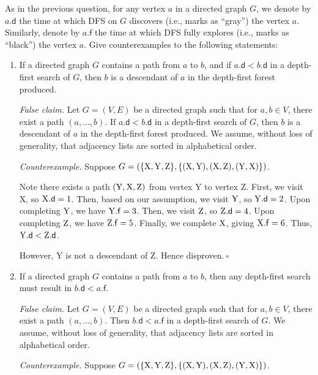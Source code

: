 \newpage
\noindent
As in the previous question, for any vertex $a$ in a directed graph $G$, we denote by $a.\mathsf{d} $ the time at which DFS on $G$ discovers (i.e., marks as ``gray'') the vertex $a$. Similarly, denote by $a.\mathsf{f} $ the time at which DFS fully explores (i.e., marks as ``black'') the vertex $a$. Give counterexamples to the following statements:
\begin{enumerate}[start=2]
    \item If a directed graph $G$ contains a path
    from $a$ to $b$, and if $a.\mathsf{d} < b.\mathsf{d}$ in a depth-first search of $G$, then $b$ is a descendant
    of $a$ in the depth-first forest produced.

\begin{solution}
\textit{False claim. }Let $G=(V,E)$ be a directed graph such that for $a,b\in V$, there exist a path $(a,\dots,b)$. If $a.\mathsf{d}<b.\mathsf{d}$ in a depth-first search of $G$, then $b$ is a descendant of $a$ in the depth-first forest produced. We assume, without loss of generality, that adjacency lists are sorted in alphabetical order.

\textit{Counterexample. }Suppose $G=(\{{\rm X},{\rm Y},{\rm Z}\},\{({\rm X},{\rm Y}),({\rm X},{\rm Z}),({\rm Y},{\rm X})\})$.

Note there exists a path $({\rm Y},{\rm X},{\rm Z})$ from vertex Y to vertex Z. First, we visit X, so ${\rm X}.\mathsf{d}=1$. Then, based on our assumption, we visit ${\rm Y}$, so ${\rm Y}.\mathsf{d}=2$. Upon completing ${\rm Y}$, we have ${\rm Y}.\mathsf{f}=3$. Then, we visit ${\rm Z}$, so ${\rm Z}.\mathsf{d}=4$. Upon completing ${\rm Z}$, we have ${\rm Z}.\mathsf{f}=5$. Finally, we complete ${\rm X}$, giving ${\rm X}.\mathsf{f}=6$. Thus, ${\rm Y}.\mathsf{d}<{\rm Z}.\mathsf{d}$.

However, Y is not a descendant of Z. Hence disproven.$~\square$
\end{solution}
\item If a directed graph $G$ contains a path from $a$ to $b$, then any depth-first search must result in $b.\mathsf{d} < a.\mathsf{f}$.
\begin{solution}
\textit{False claim. }Let $G=(V,E)$ be a directed graph such that for $a,b\in V$, there exist a path $(a,\dots,b)$. Then $b.\mathsf{d}<a.\mathsf{f}$ in a depth-first search of $G$. We assume, without loss of generality, that adjacency lists are sorted in alphabetical order.

\textit{Counterexample. }Suppose $G=(\{{\rm X},{\rm Y},{\rm Z}\},\{({\rm X},{\rm Y}),({\rm X},{\rm Z}),({\rm Y},{\rm X})\})$.


\end{solution}
\end{enumerate}
